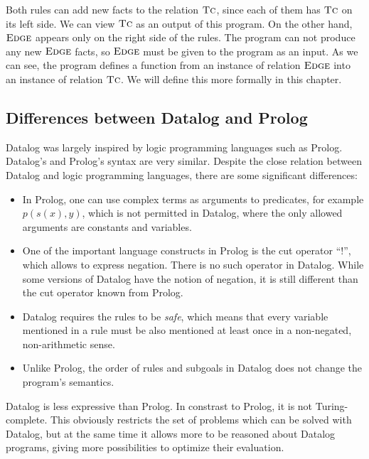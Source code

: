 Both rules can add new facts to the relation $\textsc{Tc}$, since each of them has $\textsc{Tc}$ on its left side. We can view $\textsc{Tc}$ as an output of this program. On the other hand, $\textsc{Edge}$ appears only on the right side of the rules. The program can not produce any new $\textsc{Edge}$ facts, so $\textsc{Edge}$ must be given to the program as an input. As we can see, the program defines a function from an instance of relation $\textsc{Edge}$ into an instance of relation $\textsc{Tc}$. We will define this more formally in this chapter.

\subsection{Differences between Datalog and Prolog}
Datalog was largely inspired by logic programming languages such as Prolog. Datalog's and Prolog's syntax are very similar.
Despite the close relation between Datalog and logic programming languages, there are some significant differences:


\begin{itemize}
\item In Prolog, one can use complex terms as arguments to predicates, for example $p(s(x), y)$, which is not permitted in Datalog, where the only allowed arguments are constants and variables.
\item One of the important language constructs in Prolog is the cut operator ``!'', which allows to express negation. There is no such operator in Datalog. While some versions of Datalog have the notion of negation, it is still different than the cut operator known from Prolog.
\item Datalog requires the rules to be \emph{safe}, which means that every variable mentioned in a rule must be also mentioned at least once in a non-negated, non-arithmetic sense.
\item Unlike Prolog, the order of rules and subgoals in Datalog does not change the program's semantics.
\end{itemize}

Datalog is less expressive than Prolog. In constrast to Prolog, it is not Turing-complete. This obviously restricts the set of problems which can be solved with Datalog, but at the same time it allows more to be reasoned about Datalog programs, giving more possibilities to optimize their evaluation.

